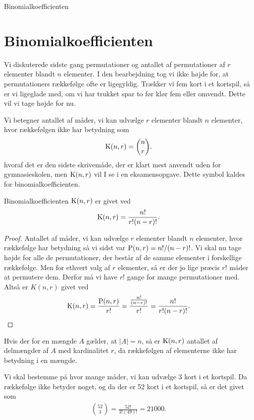 \begin{center}
\Huge
Binomialkoefficienten
\end{center}

\section*{Binomialkoefficienten}
Vi diskuterede sidste gang permutationer og antallet af permutationer af $r$ elementer blandt $n$ elementer. I den bearbejdning tog vi ikke højde for, at permutationers rækkefølge ofte er ligegyldig. Trækker vi fem kort i et kortspil, så er vi ligeglade med, om vi har trukket spar to før klør fem eller omvendt. Dette vil vi tage højde for nu. 

\begin{defn}
Vi betegner antallet af måder, vi kan udvælge $r$ elementer blandt $n$ elementer, hvor rækkefølgen ikke har betydning som
\begin{align*}
	\textnormal{K}(n,r) = \binom{n}{r}.
\end{align*}
hvoraf det er den sidste skrivemåde, der er klart mest anvendt uden for gymnasieskolen, men $\textnormal{K}(n,r)$ vil I se i en eksamensopgave. Dette symbol kaldes for binomialkoefficienten.
\end{defn}
\begin{setn}
Binomialkoefficienten $\textnormal{K}(n,r)$ er givet ved
\begin{align*}
	\textnormal{K}(n,r) = \frac{n!}{r!(n-r)!}.
\end{align*}
\end{setn}
\begin{proof}
Antallet af måder, vi kan udvælge $r$ elementer blandt $n$ elementer, hvor rækkefølge har betydning så vi sidst var $\textnormal{P}(n,r) = n!/(n-r)!$. Vi skal nu tage højde for alle de permutationer, der består af de samme elementer i forskellige rækkefølge. Men for ethvert valg af $r$ elementer, så er der jo lige præcis $r!$ måder at permutere dem. Derfor må vi have $r!$ gange for mange permutationer med. Altså er $K(n,r)$ givet ved
\begin{align*}
	\textnormal{K}(n,r) = \frac{\textnormal{P}(n,r)}{r!} = \frac{\frac{n!}{(n-r)!}}{r!} = \frac{n!}{r!(n-r)!}.
\end{align*}
\end{proof}

\begin{exa}
	Hvis der for en mængde $A$ gælder, at $|A| = n$, så er $\textnormal{K}(n,r)$ antallet af delmængder af $A$ med kardinalitet $r$, da rækkefølgen af elementerne ikke har
	betydning i en mængde.
\end{exa}
\begin{exa}
	Vi skal bestemme på hvor mange måder, vi kan udvælge 3 kort i et kortspil. Da rækkefølge ikke betyder noget, og da der er 52 kort i et kortspil, så er det givet som
	\begin{align*}
		\binom{52}{3} = \frac{52!}{3!(49)!} = 21000.
	\end{align*}
\end{exa}

